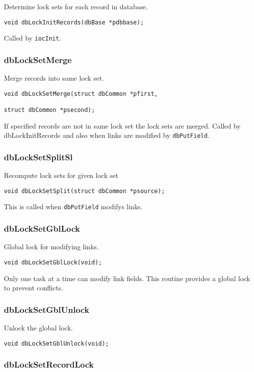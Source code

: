 Determine lock sets for each record in database.

\begin{verbatim}void dbLockInitRecords(dbBase *pdbbase);
\end{verbatim}Called by \verb|iocInit|.

\subsubsection{dbLockSetMerge}

Merge records into same lock set.

\begin{verbatim}void dbLockSetMerge(struct dbCommon *pfirst,

struct dbCommon *psecond);
\end{verbatim}If specified records are not in same lock set the lock sets are merged. Called by dbLockInitRecords and also when links 
are modified by \verb|dbPutField|.

\subsubsection{dbLockSetSplitSl}

Recompute lock sets for given lock set

\begin{verbatim}void dbLockSetSplit(struct dbCommon *psource);
\end{verbatim}This is called when \verb|dbPutField| modifys links.

\subsubsection{dbLockSetGblLock}

Global lock for modifying links.

\begin{verbatim}void dbLockSetGblLock(void);
\end{verbatim}Only one task at a time can modify link fields. This routine provides a global lock to prevent conflicts.

\subsubsection{dbLockSetGblUnlock}

Unlock the global lock.

\begin{verbatim}void dbLockSetGblUnlock(void);
\end{verbatim}\subsubsection{dbLockSetRecordLock}

